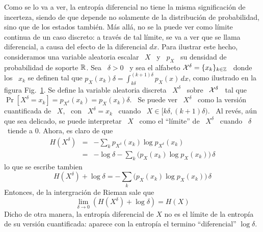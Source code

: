 Como se lo va a ver, la entrop\'ia diferencial no tiene la misma significaci\'on
de  incerteza,  siendo de  que  depende no  solamente  de  la distribuci\'on  de
probabilidad, sino que de los estados tambi\'en.  M\'as all\'a, no se la puede ver
como l\'imite continua de un caso discreto:  a trav\'es de tal l\'imite, se va a
ver que se  llama diferencial, a causa del efecto de  la diferencial $dx$.  Para
ilustrar este  hecho, consideramos una  variable aleatoria escalar  \ $X$ \  y \
$p_X$ \ su densidad de probabilidad de  soporte $\mathbb{R}$.  Sea \ $\delta > 0$ \ y
sea el  alfabeto $\mathcal{X}^\delta = \{  x_k \}_{k \in \mathbb{Z}}$  \ donde los  \ $x_k$ se
definen tal que $\displaystyle  p_X(x_k) \delta = \int_{k \delta}^{(k+1) \delta}
p_X(x) \,  dx$, como  ilustrado en la  figura Fig.~\ref{fig:SZ:CuantificacionX}.
Se define  la variable aleatoria discreta  \ $X^\delta$ \ sobre  \ $\mathcal{X}^\delta$ \
tal que  \ $\Pr[X^\delta =  x_k] = p_{X^\delta}(x_k)  = p_X(x_k) \delta$.   \ Se
puede  ver \  $X^\delta$ \  como la  versi\'on cuantificada  de \  $X$, \  con \
$X^\delta = x_k$ \  cuando \ $X \in [k \delta , (k+1)  \delta )$.  \ Al rev\'es,
a\'un que sea delicado,  se puede interpretar \ $X$ \ como  el ``l\'imite'' de \
$X^\delta$ \ cuando \ $\delta$ \ tiende a 0. Ahora, es claro de que
%
\begin{eqnarray*}
H(X^\delta) & = & - \sum_k p_{X^\delta}(x_k) \log p_{X^\delta}(x_k)\\[2.5mm]
%
& = & - \log \delta - \sum_k \Big( p_X(x_k) \log p_X(x_k) \Big) \, \delta
\end{eqnarray*}
%
lo que se escribe tambien
%
\[
H(X^\delta)  + \log  \delta =  - \sum_k  \Big( p_X(x_k)  \log p_X(x_k)  \Big) \,
\delta
\]
%
Entonces, de la intergraci\'on de Rieman sale que
%
\[
\lim_{\delta \to 0} \left( H(X^\delta) + \log \delta \right) = H(X)
\]
%
Dicho de otra manera,  la entrop\'ia diferencial de $X$ no es  el l\'imite de la
entrop\'ia de  su versi\'on cuantificada:  aparece con la entrop\'ia  el termino
``diferencial'' $\log \delta$.
%
\begin{figure}[h!]
%
\begin{center}  \end{center}
%
%
\label{fig:SZ:CuantificacionX}
\end{figure}
%

